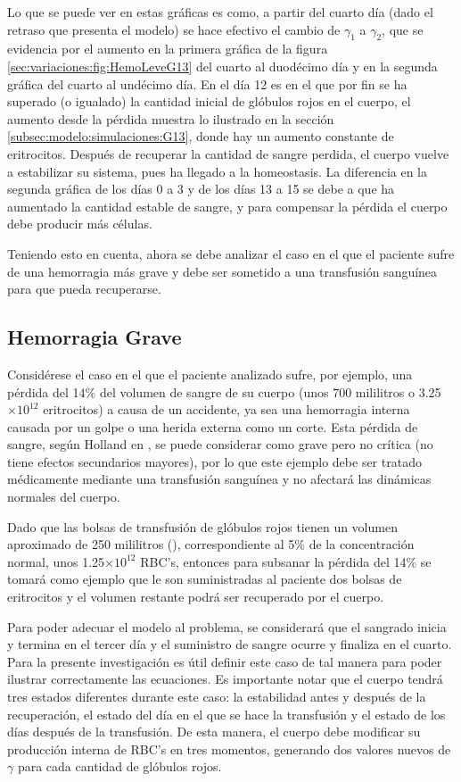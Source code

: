 Lo que se puede ver en estas gráficas es como, a partir del cuarto día (dado el retraso que presenta el modelo) se hace efectivo el cambio de $\gamma_1$ a $\gamma_2$, que se evidencia por el aumento en la primera gráfica de la figura \ref{sec:variaciones:fig:HemoLeveG13} del cuarto al duodécimo día y en la segunda gráfica del cuarto al undécimo día. En el día 12 es en el que por fin se ha superado (o igualado) la cantidad inicial de glóbulos rojos en el cuerpo, el aumento desde la pérdida muestra lo ilustrado en la sección \ref{subsec:modelo:simulaciones:G13}, donde hay un aumento constante de eritrocitos. Después de recuperar la cantidad de sangre perdida, el cuerpo vuelve a estabilizar su sistema, pues ha llegado a la homeostasis. La diferencia en la segunda gráfica de los días 0 a 3 y de los días 13 a 15 se debe a que ha aumentado la cantidad estable de sangre, y para compensar la pérdida el cuerpo debe producir más células.

Teniendo esto en cuenta, ahora se debe analizar el caso en el que el paciente sufre de una hemorragia más grave y debe ser sometido a una transfusión sanguínea para que pueda recuperarse.

\subsection{Hemorragia Grave}\label{subsec:variaciones:hemorragia:grave}

Considérese el caso en el que el paciente analizado sufre, por ejemplo, una pérdida del 14$\%$ del volumen de sangre de su cuerpo (unos 700 mililitros o 3.25$\times 10^{12}$ eritrocitos) a causa de un accidente, ya sea una hemorragia interna causada por un golpe o una herida externa como un corte. Esta pérdida de sangre, según Holland en \cite{PerdidaSangre}, se puede considerar como grave pero no crítica (no tiene efectos secundarios mayores), por lo que este ejemplo debe ser tratado médicamente mediante una transfusión sanguínea y no afectará las dinámicas normales del cuerpo.

Dado que las bolsas de transfusión de glóbulos rojos tienen un volumen aproximado de 250 mililitros (\cite{Granada}), correspondiente al 5$\%$ de la concentración normal, unos 1.25$\times 10^{12}$ RBC's, entonces para subsanar la pérdida del 14$\%$ se tomará como ejemplo que le son suministradas al paciente dos bolsas de eritrocitos y el volumen restante podrá ser recuperado por el cuerpo.

Para poder adecuar el modelo al problema, se considerará que el sangrado inicia y termina en el tercer día y el suministro de sangre ocurre y finaliza en el cuarto. Para la presente investigación es útil definir este caso de tal manera para poder ilustrar correctamente las ecuaciones. Es importante notar que el cuerpo tendrá tres estados diferentes durante este caso: la estabilidad antes y después de la recuperación, el estado del día en el que se hace la transfusión y el estado de los días después de la transfusión. De esta manera, el cuerpo debe modificar su producción interna de RBC's en tres momentos, generando dos valores nuevos de $\gamma$ para cada cantidad de glóbulos rojos.

